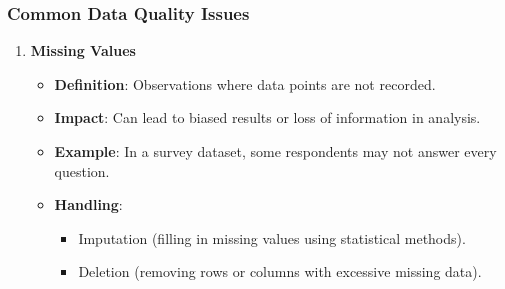 \documentclass[aspectratio=169]{beamer}
\begin{document}
\begin{frame}[fragile]
    \frametitle{Common Data Quality Issues}
    \begin{enumerate}
        \item \textbf{Missing Values}
        \begin{itemize}
            \item \textbf{Definition}: Observations where data points are not recorded.
            \item \textbf{Impact}: Can lead to biased results or loss of information in analysis.
            \item \textbf{Example}: In a survey dataset, some respondents may not answer every question.
            \item \textbf{Handling}: 
                \begin{itemize}
                    \item Imputation (filling in missing values using statistical methods).
                    \item Deletion (removing rows or columns with excessive missing data).
                \end{itemize}
        \end{itemize}
    \end{enumerate}
\end{frame}
\end{document}
